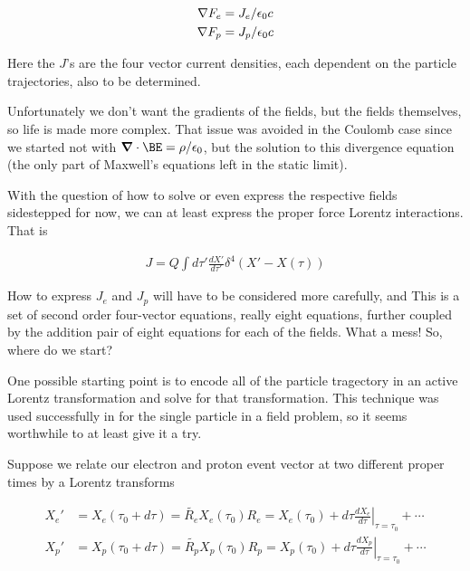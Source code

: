 \begin{align}\label{eqn:nuclearInteraction:hoo4}
\nabla F_e &= J_e/\epsilon_0 c \\
\nabla F_p &= J_p/\epsilon_0 c
\end{align}

Here the $J$'s are the four vector current densities, each dependent on the particle trajectories, also to be determined.

Unfortunately we don't want the gradients of the fields, but the fields themselves, so life is made more complex.  That issue was avoided in the Coulomb case since we started not with $\spacegrad \cdot \BE = \rho/\epsilon_0$, but the solution to this divergence equation (the only part of Maxwell's equations left in the static limit).





With the question of how to solve or even express the respective fields sidestepped for now, we can at least express the proper force Lorentz interactions.  That is

\begin{align}\label{eqn:nuclearInteraction:hoo5}
J = Q \int d\tau' \frac{dX'}{d\tau'} \delta^4 (X' - X(\tau))
\end{align}


How to express $J_e$ and $J_p$ will have to be considered more carefully, and 
This is a set of second order four-vector equations, really eight equations, further coupled by the addition pair of eight equations for each of the fields.  What a mess!  So, where do we start?

One possible starting point is to encode all of the particle tragectory in an active Lorentz transformation and solve for that transformation.  This technique was used successfully in \cite{doran2003gap} for the single particle in a field problem, so it seems worthwhile to at least give it a try.

Suppose we relate our electron and proton event vector at two different proper times by a Lorentz transforms

\begin{align*}
X_e' &= X_e(\tau_0 + d\tau) = \tilde{R_e} X_e(\tau_0) R_e = X_e(\tau_0) + d\tau {\left. \frac{dX_e}{d\tau} \right\vert}_{\tau = \tau_0} + \cdots \\
X_p' &= X_p(\tau_0 + d\tau) = \tilde{R_p} X_p(\tau_0) R_p = X_p(\tau_0) + d\tau {\left. \frac{dX_p}{d\tau} \right\vert}_{\tau = \tau_0} + \cdots
\end{align*}


